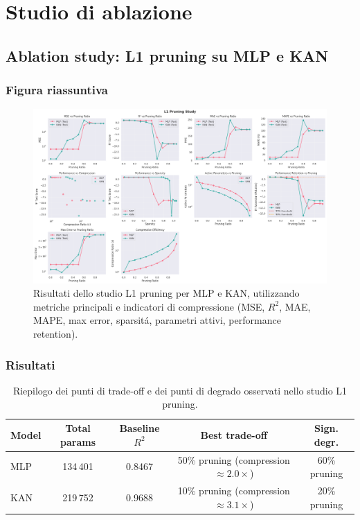 \documentclass[a4paper,12pt]{report}
\begin{document}
	\section{Studio di ablazione}
	
	\subsection{Ablation study: L1 pruning su MLP e KAN}
	
	\subsubsection{Figura riassuntiva}
	\begin{figure}[H]
		\centering
		\includegraphics[width=1.0\textwidth]{img/abl_kanvsmlp_car.png}
		\caption{Risultati dello studio L1 pruning per MLP e KAN, utilizzando metriche principali e indicatori di compressione (MSE, \(R^2\), MAE, MAPE, max error, sparsitá, parametri attivi, performance retention).}
	\end{figure}
	
	\subsubsection{Risultati}
	\begin{table}[H]
		\centering
		\setlength{\tabcolsep}{2pt}
		\begin{tabular}{lcccc}
			\toprule
			\textbf{Model} & \textbf{Total params} & \textbf{Baseline $R^2$} & \textbf{Best trade-off} & \textbf{Sign. degr.} \\
			\midrule
			MLP & 134\,401  & 0.8467 & 50\% pruning (compression $\approx 2.0\times$) & 60\% pruning \\
			KAN & 219\,752  & 0.9688 & 10\% pruning (compression $\approx 3.1\times$) & 20\% pruning \\
			\bottomrule
		\end{tabular}
		\caption{Riepilogo dei punti di trade-off e dei punti di degrado osservati nello studio L1 pruning.}
	\end{table}
	
\end{document}
